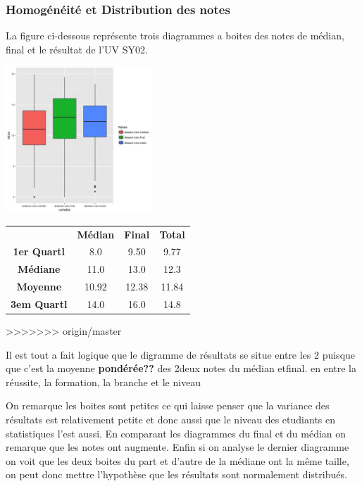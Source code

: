\documentclass[10pt]{article}
\begin{document}
\subsubsection{Homogénéité et Distribution des notes}
La figure ci-dessous représente trois diagrammes a boites des notes de médian, final et le résultat de l'UV SY02. 

\begin{minipage}{.4\textwidth}	
	\includegraphics[width=55mm]{Figures/Notes/boxplot_exam.jpg}
	\label{fig:Boxplot_notes}
\end{minipage}%
\hspace{0.03\linewidth}
\begin{minipage}{.6\textwidth}
	\begin{tabular}{ c c c c }
		\textbf{}       & \textbf{Médian} & \textbf{Final}   & \textbf{Total} \\
		\textbf{1er Quartl}    & 8.0 			       & 9.50		      & 9.77    \\
		\textbf{Médiane  }   &11.0		             & 13.0	            & 12.3    \\
		\textbf{Moyenne}     & 10.92                &  12.38          & 11.84\\
		\textbf{3em Quartl}  & 14.0  				& 16.0 		       & 14.8\\
	\end{tabular}
\end{minipage}
>>>>>>> origin/master

Il est tout a fait logique que le digramme de résultats se situe entre les 2 puisque que c'est la moyenne \textbf{pondérée??} des 2deux notes du médian etfinal.                              en entre la réussite, la formation, la branche et le niveau

On remarque les boites sont petites ce qui laisse penser que la variance des résultats est relativement petite et donc aussi que le niveau des etudiants en statistiques l'est aussi.  En comparant les diagrammes du final et du médian on remarque que les notes ont augmente.  Enfin si on analyse le dernier diagramme on voit que les deux boites du part et d'autre de la médiane ont la même taille, on peut donc mettre l'hypothèse que les résultats sont normalement distribués. 
\end{document}
